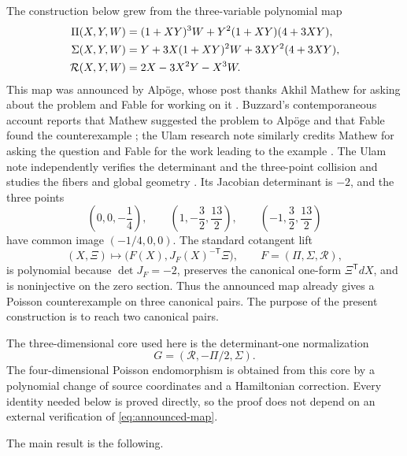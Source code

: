 \documentclass[11pt]{article}
\theoremstyle{remark}
\begin{document}
The construction below grew from the three-variable polynomial map
\begin{align}
  \Pi(X,Y,W)
    &=(1+XY)^3W+Y^2(1+XY)(4+3XY),\notag\\
  \Sigma(X,Y,W)
    &=Y+3X(1+XY)^2W+3XY^2(4+3XY),\notag\\
  \mathcal R(X,Y,W)
    &=2X-3X^2Y-X^3W.\label{eq:announced-map}
\end{align}
This map was announced by Alp\"oge, whose post thanks Akhil Mathew for asking
about the problem and Fable for working on it \cite{Alpoge}.  Buzzard's
contemporaneous account reports that Mathew suggested the problem to Alp\"oge
and that Fable found the counterexample \cite{Buzzard}; the Ulam research note
similarly credits Mathew for asking the question and Fable for the work leading
to the example \cite[Introduction]{UlamJacobian}.  The Ulam note independently
verifies the determinant and the three-point collision and studies the fibers
and global geometry \cite[Theorem~3.1 and Section~4]{UlamJacobian}.  Its
Jacobian determinant is \(-2\), and the three points
\begin{equation}\label{eq:announced-core-points}
  \left(0,0,-\frac14\right),\qquad
  \left(1,-\frac32,\frac{13}{2}\right),\qquad
  \left(-1,\frac32,\frac{13}{2}\right)
\end{equation}
have common image \((-1/4,0,0)\).  The standard cotangent lift
\[
  (X,\Xi)\longmapsto
  \bigl(F(X),J_F(X)^{-\mathsf T}\Xi\bigr),
  \qquad F=(\Pi,\Sigma,\mathcal R),
\]
is polynomial because \(\det J_F=-2\), preserves the canonical one-form
\(\Xi^{\mathsf T}dX\), and is noninjective on the zero section.  Thus the
announced map already gives a Poisson counterexample on three canonical pairs.
The purpose of the present construction is to reach two canonical pairs.

The three-dimensional core used here is the determinant-one normalization
\begin{equation}\label{eq:normalized-core-intro}
  G=(\mathcal R,-\Pi/2,\Sigma).
\end{equation}
The four-dimensional Poisson endomorphism is obtained from this core by a
polynomial change of source coordinates and a Hamiltonian correction.  Every
identity needed below is proved directly, so the proof does not depend on an
external verification of \eqref{eq:announced-map}.

The main result is the following.
\end{document}
